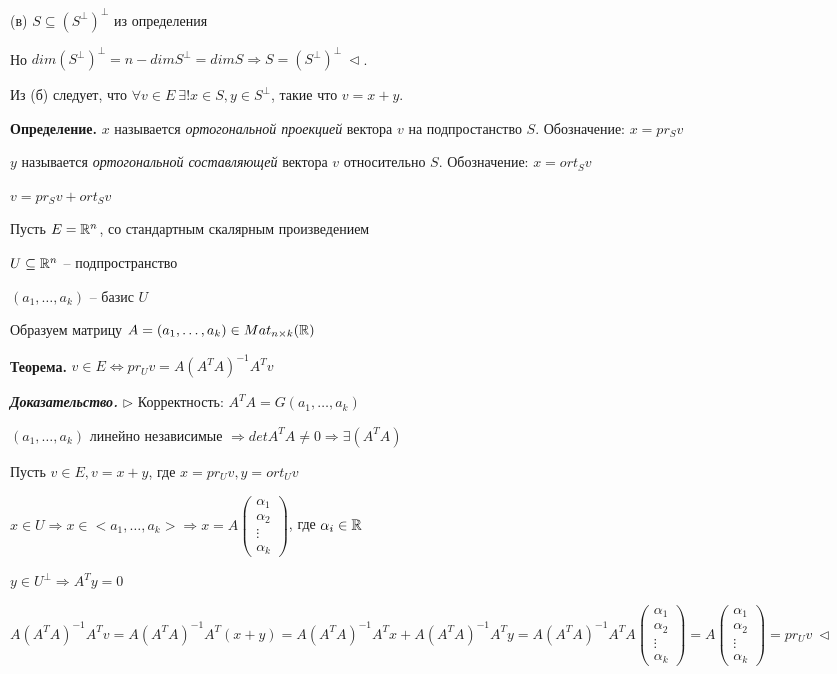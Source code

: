 (в) $S \subseteq (S^{\bot})^{\bot}$ из определения

Но $dim(S^{\bot})^{\bot} = n - dim S^{\bot} = dim S \Rightarrow S = (S^{\bot})^{\bot} \ \lhd$.

\vspace{\baselineskip}
Из (б) следует, что $\forall v \in E \ \exists! x \in S, y \in S^{\bot}$, такие что $v = x + y$.

\vspace{\baselineskip}
\textbf{Определение.} $x$ называется \textit{ортогональной проекцией} вектора $v$ на подпростанство $S$. Обозначение: $x = pr_S v$

$y$ называется \textit{ортогональной составляющей} вектора $v$ относительно $S$. Обозначение: $x = ort_S v$

$v = pr_S v + ort_S v$

\vspace{\baselineskip}
Пусть $E = \mathbb{R}^n$, со стандартным скалярным произведением

$U \subseteq \mathbb{R}^n$ -- подпространство

$(a_1, \dots, a_k)$ -- базис $U$

Образуем матрицу $A = (a_1, \dots, a_k) \in Mat_{n \times k} (\mathbb{R})$

\vspace{\baselineskip}
\textbf{Теорема.} $v \in E \Leftrightarrow pr_U v = A (A^T A)^{-1} A^T v$

\vspace{\baselineskip}
\textbf{\textit{Доказательство.}} $\rhd$ Корректность: $A^T A = G(a_1, \dots, a_k)$

$(a_1, \dots, a_k)$ линейно независимые $\Rightarrow det A^T A \neq 0 \Rightarrow \exists (A^T A)$

Пусть $v \in E, v = x + y$, где $x = pr_U v, y = ort_U v$

$x \in U \Rightarrow x \in <a_1, \dots, a_k> \Rightarrow x  = A \begin{pmatrix} \alpha_1 \\ \alpha_2 \\ \vdots \\ \alpha_k \end{pmatrix}$, где $\alpha_i \in \mathbb{R}$

$y \in U^{\bot} \Rightarrow A^T y = 0$

$A (A^T A)^{-1} A^T v = A (A^T A)^{-1} A^T (x + y) = A (A^T A)^{-1} A^T x + A (A^T A)^{-1} A^T y = A (A^T A)^{-1} A^T A \begin{pmatrix} \alpha_1 \\ \alpha_2 \\ \vdots \\ \alpha_k \end{pmatrix} = A \begin{pmatrix} \alpha_1 \\ \alpha_2 \\ \vdots \\ \alpha_k \end{pmatrix} = pr_U v \ \lhd$

